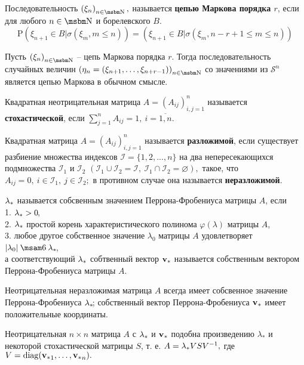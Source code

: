 \begin{opr}
Последовательность $\left(\xi_n\right)_{n \in \N},$ называется \textbf{цепью Маркова порядка \boldmath$r$}, если для любого $n \in \N$ и борелевского $B.$ 
$$\mathrm{P} (\xi_{n + 1} \in B | \sigma(\xi_m, m \leq n)) = (\xi_{n + 1} \in B | \sigma(\xi_m, n - r + 1 \leq m \leq n))$$
\end{opr}

\begin{ass}
Пусть $\left(\xi_n\right)_{n \in \N}$ -- цепь Маркова порядка $r.$ Тогда последовательность случайных величин $\left(\eta_n = (\xi_{n+1},\ldots, \xi_{n+r-1})\right)_{n \in \N}$ со значениями из $\mathcal{S}^n$ является цепью Маркова в обычном смысле. 
\end{ass}

\begin{opr}
Квадратная неотрицательная матрица $A = (A_{ij})_{i,j = 1}^n$ называется \textbf{стохастической}, если
 $\sum_{j=1}^n A_{ij} = 1, \ i = \overline{1, n}.$
\end{opr}

\begin{opr}
Квадратная матрица $A = (A_{ij})_{i,j = 1}^n$ называется \textbf{разложимой}, если существует разбиение множества индексов $\mathcal{I} = \{1, 2, ..., n\}$ на два непересекающихся подмножества $ \mathcal{I}_1$ и $\mathcal{I}_2$ $(\mathcal{I}_1 \cup \mathcal{I}_2 = \mathcal{I}, \ \mathcal{I}_1 \cap \mathcal{I}_2 = \varnothing), $ такое, что $A_{ij} = 0,\  i \in \mathcal{I}_1,\ j \in \mathcal{I}_2;$ в противном случае она называется \textbf{неразложимой}.
\end{opr}

\begin{opr}
${\lambda_\ast}$ называется собсвенным значением Перрона-Фробениуса матрицы $A\!$, если \\
1. ${\lambda_\ast} > 0 \!$,\\
2. ${\lambda_\ast}$ простой корень характеристического полинома $\varphi(\lambda)$ матрицы $A\!$, \\
3. любое другое собственное значение $\lambda_0$ матрицы $A$ удовлетворяет $|\lambda_0| \leq \la \!$, \\
а соответствующий ${\lambda_\ast}$ собтвенный вектор ${\mathbf{v}_\ast}$ называется собственным вектором Перрона-Фробениуса матрицы $A.$
\end{opr}

\begin{ttt}
\label{T-Perr_Fro}
Неотрицательная неразложимая матрица $A$ всегда имеет собсвенное значение Перрона-Фробениуса ${\lambda_\ast}\!$; собственный вектор Перрона-Фробениуса ${\mathbf{v}_\ast}$ имеет положительные координаты.
\end{ttt}

\begin{col}
\label{NEOTR_V_STOCH}
Неотрицательная $n \times n$ матрица $A$ с ${\lambda_\ast}$ и ${\mathbf{v}_\ast}$ подобна произведению $\lambda_\ast$ и некоторой стохастической матрицы $S$, т. е. $A = {\lambda_\ast} VSV^{-1},$ где $V = \mathop{\rm diag}\nolimits({\mathbf{v}_\ast}_1, \ldots, {\mathbf{v}_\ast}_n).$
\end{col}